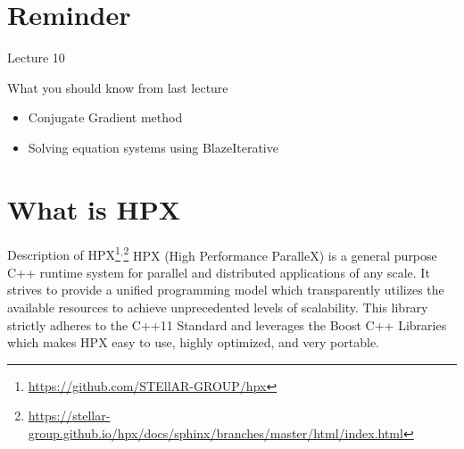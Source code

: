 \documentclass[\classoption]{beamer}
\title{\coursename}
\subtitle{Lecture 11: Introduction to HPX}
\author{\tiny Patrick Diehl \orcid{0000-0003-3922-8419}}
\date {
 \tiny \url{\courseurl}
\vspace{2cm}
\doclicenseThis  
  
}
\begin{document}
 {
    \frame {
        \titlepage
    }
}

\frame{

\tableofcontents

}


\section{Reminder}
\begin{frame}{Lecture 10}
\begin{block}{What you should know from last lecture}
\begin{itemize}
\item Conjugate Gradient method
\item Solving equation systems using BlazeIterative
\end{itemize}
\end{block}
\end{frame}


\section{What is HPX}

\begin{frame}{Description of HPX\footnote{\tiny\url{https://github.com/STEllAR-GROUP/hpx}}$^,$\footnote{\tiny\url{https://stellar-group.github.io/hpx/docs/sphinx/branches/master/html/index.html}}}
HPX (High Performance ParalleX) is a general purpose C++ runtime system for parallel and distributed applications of any scale. It strives to provide a unified programming model which transparently utilizes the available resources to achieve unprecedented levels of scalability.  This library strictly adheres to the C++11 Standard and leverages the Boost C++ Libraries which makes HPX easy to use, highly optimized, and very portable. 
\end{frame}
\end{document}
